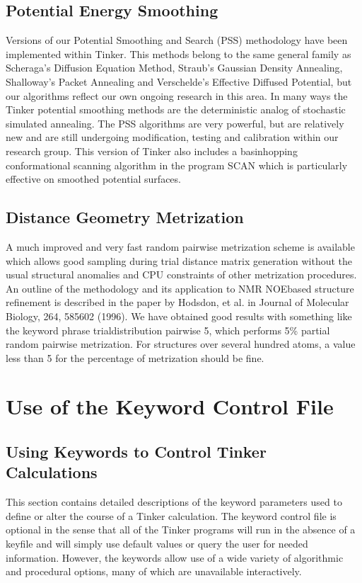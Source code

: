 \documentclass[letterpaper,11pt,english]{sphinxmanual}
\begin{document}
\section{Potential Energy Smoothing}
\label{\detokenize{text/special-features:potential-energy-smoothing}}
Versions of our Potential Smoothing and Search (PSS) methodology have been implemented within Tinker. This methods belong to the same general family as Scheraga’s Diffusion Equation Method, Straub’s Gaussian Density Annealing, Shalloway’s Packet Annealing and Verschelde’s Effective Diffused Potential, but our algorithms reflect our own ongoing research in this area. In many ways the Tinker potential smoothing methods are the deterministic analog of stochastic simulated annealing. The PSS algorithms are very powerful, but are relatively new and are still undergoing modification, testing and calibration within our research group. This version of Tinker also includes a basin\sphinxhyphen{}hopping conformational scanning algorithm in the program SCAN which is particularly effective on smoothed potential surfaces.


\section{Distance Geometry Metrization}
\label{\detokenize{text/special-features:distance-geometry-metrization}}
A much improved and very fast random pairwise metrization scheme is available which allows good sampling during trial distance matrix generation without the usual structural anomalies and CPU constraints of other metrization procedures. An outline of the methodology and its application to NMR NOE\sphinxhyphen{}based structure refinement is described in the paper by Hodsdon, et al. in Journal of Molecular Biology, 264, 585\sphinxhyphen{}602 (1996). We have obtained good results with something like the keyword phrase trial\sphinxhyphen{}distribution pairwise 5, which performs 5\% partial random pairwise metrization. For structures over several hundred atoms, a value less than 5 for the percentage of metrization should be fine.


\chapter{Use of the Keyword Control File}
\label{\detokenize{text/keywords:use-of-the-keyword-control-file}}\label{\detokenize{text/keywords::doc}}

\section{Using Keywords to Control Tinker Calculations}
\label{\detokenize{text/keywords:using-keywords-to-control-tinker-calculations}}
This section contains detailed descriptions of the keyword parameters used to define or alter the course of a Tinker calculation. The keyword control file is optional in the sense that all of the Tinker programs will run in the absence of a keyfile and will simply use default values or query the user for needed information. However, the keywords allow use of a wide variety of algorithmic and procedural options, many of which are unavailable interactively.
\end{document}
